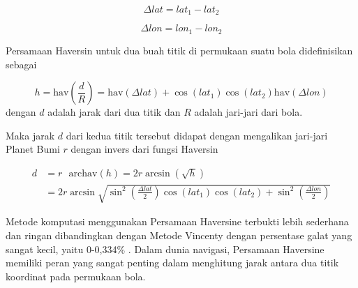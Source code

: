 \begin{equation}
	\Delta lat = lat_1 - lat_2
	\label{eq:delt-lat}
\end{equation}

\begin{equation}
	\Delta lon = lon_1 - lon_2
	\label{eq:delt-lon}
\end{equation}


Persamaan Haversin untuk dua buah titik di permukaan suatu bola didefinisikan sebagai

\begin{equation}
	h = \mathrm{hav}\left(\frac{d}{R}\right) = \mathrm{hav}\left(\Delta lat\right) + \cos{\left(lat_1\right)} \cos{\left(lat_2\right)} \mathrm{hav}\left(\Delta lon\right)
	\label{eq:haversine2}
\end{equation}
dengan $d$ adalah jarak dari dua titik dan $R$ adalah jari-jari dari bola.

Maka jarak $d$ dari kedua titik tersebut didapat dengan mengalikan jari-jari Planet Bumi $r$ dengan invers dari fungsi Haversin \cite{Omatu2013}

$$
\begin{aligned}
	d &= r \text{ }\mathrm{archav}(h) = 2r \arcsin{\left(\sqrt{h}\right)} \\
	&= 2r \arcsin{\sqrt{\sin^2{\left(\frac{\Delta lat}{2}\right)}  \cos{(lat_1)}\cos{(lat_2)} +\sin^2{\left(\frac{\Delta lon}{2}\right)}}}
\end{aligned} 
$$

Metode komputasi menggunakan Persamaan Haversine terbukti lebih sederhana dan ringan dibandingkan dengan Metode Vincenty dengan persentase galat yang sangat kecil, yaitu 0-0,334\% \cite{Mahmoud2016}. Dalam dunia navigasi, Persamaan Haversine memiliki peran yang sangat penting dalam menghitung jarak antara dua titik koordinat pada permukaan bola.


